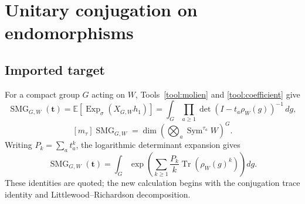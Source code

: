\documentclass[10pt]{article}
\newcommand{\Sym}{\operatorname{Sym}}
\newcommand{\Tr}{\operatorname{Tr}}
\newcommand{\ExpS}{\operatorname{Exp}_{\sigma}}
\newcommand{\SMG}{\operatorname{SMG}}
\newcommand{\smgv}[2]{\mathbb E\!\left[\ExpS\!\left(X_{#1,#2}h_1\right)\right]}
\newcommand{\C}{\mathbb C}
\newcommand{\End}{\operatorname{End}}
\newcommand{\Ad}{\operatorname{Ad}}
\begin{document}
\section{Unitary conjugation on endomorphisms}\label{proof:unitary-conjugation}
\begingroup
{}
\providecommand{\C}{\mathbb C}
\renewcommand{\C}{\mathbb C}
\providecommand{\End}{\operatorname{End}}
\renewcommand{\End}{\operatorname{End}}
\providecommand{\Sym}{\operatorname{Sym}}
\renewcommand{\Sym}{\operatorname{Sym}}
\providecommand{\tr}{\operatorname{Tr}}
\renewcommand{\tr}{\operatorname{Tr}}
\providecommand{\Ad}{\operatorname{Ad}}
\renewcommand{\Ad}{\operatorname{Ad}}
\providecommand{\Scal}{\SMG}
\renewcommand{\Scal}{\SMG}
\providecommand{\Sfun}{\mathbb S}
\renewcommand{\Sfun}{\mathbb S}
\providecommand{\lr}[2]{c_{#1}^{#2}}
\renewcommand{\lr}[2]{c_{#1}^{#2}}
\setcounter{theorem}{0}
\setcounter{proposition}{0}
\setcounter{lemma}{0}
\setcounter{corollary}{0}
\setcounter{remark}{0}
\begin{abstract}
For the conjugation representation of $U(n)$ on
$W=\End(\C^n)$, this note proves the trace form of the generalized Molien
integral, an exact finite-rank Littlewood--Richardson coefficient formula, and
the stable description by colored necklaces.  The formulas are checked by an
independent matrix computation.  The accompanying marimo notebook constructs
unitary generators and their $n^2$-dimensional conjugation matrices, builds the
full derived action on tensor products of symmetric powers, and computes its
common kernel.  All 18 representative comparisons pass for $1\leq n\leq4$,
total degrees through $3$, and full target dimensions through $405$.  The
checks include the nonstable value $5$ at $n=2$, $\tau=(1,1,1)$, versus the
stable value $6$.
\end{abstract}

\subsection{Imported target}
For a compact group $G$ acting on $W$, Tools~\ref{tool:molien} and
\ref{tool:coefficient} give
\begin{equation}\label{unitary-conjugation-proof-and-verification:eq:definition}
\Scal_{G,W}(\mathbf t)=\smgv{G}{W}
=\int_G\prod_{a\ge1}\det(I-t_a\rho_W(g))^{-1}\,dg,
\end{equation}
\begin{equation}\label{unitary-conjugation-proof-and-verification:eq:target}
[m_\tau]\Scal_{G,W}=\dim\left(\bigotimes_a\Sym^{\tau_a}W\right)^G.
\end{equation}
Writing $P_k=\sum_a t_a^k$, the logarithmic determinant expansion gives
\begin{equation}\label{unitary-conjugation-proof-and-verification:eq:exponential}
\boxed{\Scal_{G,W}(\mathbf t)=\int_G\exp\!\left(
\sum_{k\ge1}\frac{P_k}{k}\Tr(\rho_W(g)^k)\right)dg.}
\end{equation}
These identities are quoted; the new calculation begins with the conjugation
trace identity and Littlewood--Richardson decomposition.
\end{document}
